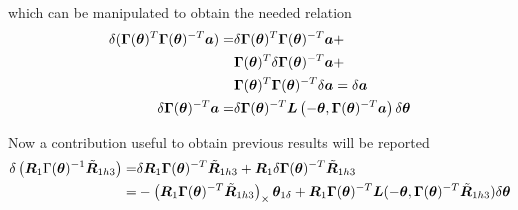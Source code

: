 which can be manipulated to obtain the needed relation
\begin{align}
  \nonumber
  \delta(\bm{\Gamma}(\bm{\theta})^T \bm{\Gamma}(\bm{\theta})^{-T}\bm{a})=&
  \delta\bm{\Gamma}(\bm{\theta})^T\bm{\Gamma}(\bm{\theta})^{-T}\bm{a}+ \\
  \nonumber
  &\bm{\Gamma}(\bm{\theta})^T\delta\bm{\Gamma}(\bm{\theta})^{-T}\bm{a}+ \\
  &\bm{\Gamma}(\bm{\theta})^T\bm{\Gamma}(\bm{\theta})^{-T}\delta\bm{a}=\delta\bm{a} \\
  \delta\bm{\Gamma}(\bm{\theta})^{-T}\bm{a}=&\delta\bm{\Gamma}(\bm{\theta})^{-T}
  \bm{L}\left(-\bm{\theta}, \bm{\Gamma}(\bm{\theta})^{-T}\bm{a}\right) \delta\bm{\theta}
  \label{L_definition2}
\end{align}

Now a contribution useful to obtain previous results will be reported
\begin{align}
  \nonumber
  \delta\left(\bm{R}_1\Gamma(\bm{\theta})^{-1}\tilde{\bm{R}}_{1h3}\right)=&
  \delta\bm{R}_1\bm{\Gamma}(\bm{\theta})^{-T}\tilde{\bm{R}}_{1h3}+
  \bm{R}_1\delta\bm{\Gamma}(\bm{\theta})^{-T}\tilde{\bm{R}}_{1h3}\\
  \nonumber
  =&-\left(\bm{R}_1\bm{\Gamma}(\bm{\theta})^{-T}\tilde{\bm{R}}_{1h3}\right)_\times\bm{\theta}_{1\delta}+
  \bm{R}_1\bm{\Gamma}(\bm{\theta})^{-T}
  \bm{L}(-\bm{\theta},\bm{\Gamma}(\bm{\theta})^{-T}\tilde{\bm{R}}_{1h3})\delta\bm{\theta}
\end{align}

